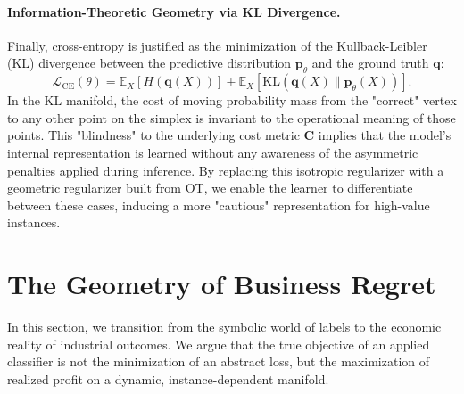 \documentclass[sigconf,anonymous]{acmart}
\newcommand{\vp}{\mathbf{p}}
\newcommand{\vq}{\mathbf{q}}
\newcommand{\mC}{\mathbf{C}}
\newcommand{\KL}{\mathrm{KL}}
\newcommand{\E}{\mathbb{E}}
\begin{document}
\paragraph{Information-Theoretic Geometry via KL Divergence.}
Finally, cross-entropy is justified as the minimization of the Kullback-Leibler (KL) divergence between the predictive distribution $\vp_\theta$ and the ground truth $\vq$:
\begin{equation}
\mathcal{L}_{\text{CE}}(\theta) = \E_X[H(\vq(X))] + \E_X[\KL(\vq(X) \| \vp_\theta(X))].
\end{equation}
In the KL manifold, the cost of moving probability mass from the "correct" vertex to any other point on the simplex is invariant to the operational meaning of those points. This "blindness" to the underlying cost metric $\mC$ implies that the model's internal representation is learned without any awareness of the asymmetric penalties applied during inference. By replacing this isotropic regularizer with a geometric regularizer built from OT, we enable the learner to differentiate between these cases, inducing a more "cautious" representation for high-value instances.

\section{The Geometry of Business Regret}
\label{sec:decision}
In this section, we transition from the symbolic world of labels to the economic reality of industrial outcomes. We argue that the true objective of an applied classifier is not the minimization of an abstract loss, but the maximization of realized profit on a dynamic, instance-dependent manifold.
\end{document}
